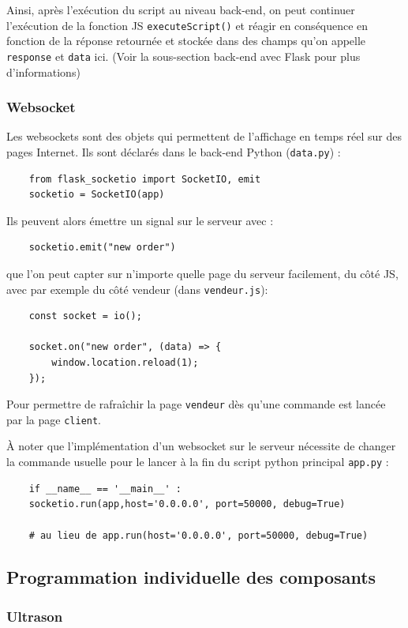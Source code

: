 \documentclass[a4paper,12pt]{report}  %
\begin{document}
Ainsi, après l’exécution du script au niveau back-end, on peut continuer l’exécution de la fonction JS \texttt{executeScript()} et réagir en conséquence en fonction de la réponse retournée et stockée dans des champs qu’on appelle \texttt{response} et \texttt{data} ici. (Voir la sous-section back-end avec Flask pour plus d’informations)

\subsubsection{Websocket}

Les websockets sont des objets qui permettent de l’affichage en temps réel sur des pages Internet. Ils sont déclarés dans le back-end Python (\texttt{data.py}) : 
\begin{lstlisting}
	from flask_socketio import SocketIO, emit
	socketio = SocketIO(app)
\end{lstlisting}

Ils peuvent alors émettre un signal sur le serveur avec : 
\begin{lstlisting}
	socketio.emit("new order")
\end{lstlisting}
que l’on peut capter sur n’importe quelle page du serveur facilement, du côté JS, avec par exemple du côté vendeur (dans \texttt{vendeur.js}): 
\begin{lstlisting}
	const socket = io();
	
	socket.on("new order", (data) => {
		window.location.reload(1);
	});
\end{lstlisting}

Pour permettre de rafraîchir la page \texttt{vendeur} dès qu’une commande est lancée par la page \texttt{client}.

À noter que l’implémentation d’un websocket sur le serveur nécessite de changer la commande usuelle pour le lancer à la fin du script python principal \texttt{app.py} :
\begin{lstlisting}
	if __name__ == '__main__' :
	socketio.run(app,host='0.0.0.0', port=50000, debug=True)
	
	# au lieu de app.run(host='0.0.0.0', port=50000, debug=True)
\end{lstlisting}

\subsection{Programmation individuelle des composants}

\subsubsection{Ultrason}
\end{document}

